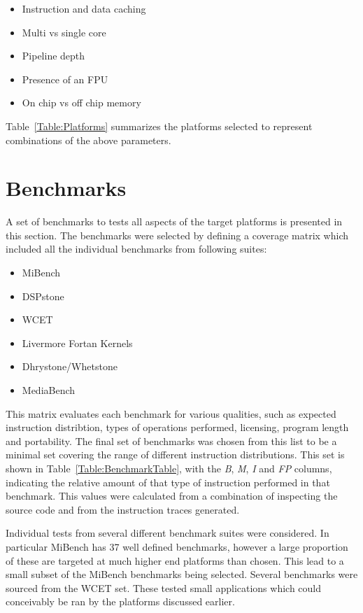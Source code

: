 \documentclass[twocolumn]{article}
\begin{document}
\begin{itemize}
	\setlength{\itemsep}{-0.25em}
	\item Instruction and data caching
	\item Multi vs single core
	\item Pipeline depth
	\item Presence of an FPU
	\item On chip vs off chip memory
\end{itemize}

Table~\ref{Table:Platforms} summarizes the platforms selected to represent combinations of the above parameters.

\section{Benchmarks}

A set of benchmarks to tests all aspects of the target platforms is presented in this section. The benchmarks were selected by defining a coverage matrix which included all the individual benchmarks from following suites:
\begin{itemize}
	\setlength{\itemsep}{-0.35em}
	\item MiBench
	\item DSPstone
	\item WCET
	\item Livermore Fortan Kernels
	\item Dhrystone/Whetstone
	\item MediaBench
\end{itemize}

This matrix evaluates each benchmark for various qualities, such as expected instruction distribtion, types of operations performed, licensing, program length and portability. The final set of benchmarks was chosen from this list to be a minimal set covering the range of different instruction distributions. This set is shown in Table~\ref{Table:BenchmarkTable}, with the \textit{B}, \textit{M}, \textit{I} and \textit{FP} columns, indicating the relative amount of that type of instruction performed in that benchmark. This values were calculated from a combination of inspecting the source code and from the instruction traces generated.

Individual tests from several different benchmark suites were considered. In particular MiBench has 37 well defined benchmarks, however a large proportion of these are targeted at much higher end platforms than chosen. This lead to a small subset of the MiBench benchmarks being selected. Several benchmarks were sourced from the WCET set. These tested small applications which could conceivably be ran by the platforms discussed earlier.
\end{document}
